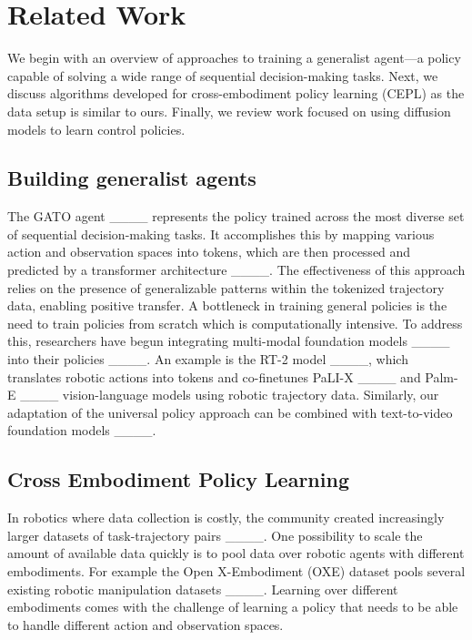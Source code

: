 \section{Related Work}
We begin with an overview of approaches to training a generalist agent—a policy capable of solving a wide range of sequential decision-making tasks. Next, we discuss algorithms developed for cross-embodiment policy learning (CEPL) as the data setup is similar to ours. Finally, we review work focused on using diffusion models to learn control policies.

\subsection{Building generalist agents}

The GATO agent ____ represents the policy trained across the most diverse set of sequential decision-making tasks. It accomplishes this by mapping various action and observation spaces into tokens, which are then processed and predicted by a transformer architecture ____. The effectiveness of this approach relies on the presence of generalizable patterns within the tokenized trajectory data, enabling positive transfer. A bottleneck in training general policies is the need to train policies from scratch which is computationally intensive. To address this, researchers have begun integrating multi-modal foundation models ____ into their policies ____. An example is the RT-2 model ____, which translates robotic actions into tokens and co-finetunes PaLI-X ____ and Palm-E ____ vision-language models using robotic trajectory data. Similarly, our adaptation of the universal policy approach can be combined with text-to-video foundation models ____.

\subsection{Cross Embodiment Policy Learning}

In robotics where data collection is costly, the community created increasingly larger datasets of task-trajectory pairs ____. One possibility to scale the amount of available data quickly is to pool data over robotic agents with different embodiments. For example the Open X-Embodiment (OXE) dataset pools several existing robotic manipulation datasets ____. Learning over different embodiments comes with the challenge of learning a policy that needs to be able to handle different action and observation spaces.

